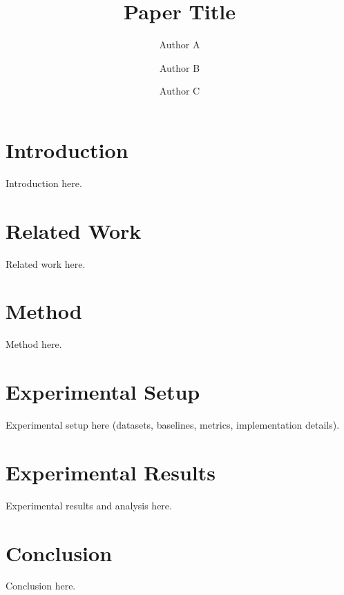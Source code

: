 \documentclass[10pt,a4paper,logo]{paper}
\title{Paper Title}
\author[1,\footnotesize{\textbf{*}}]{Author A}
\author[1,\footnotesize{\textbf{*}}]{Author B}
\author[1,\footnotesize{$\dagger$}]{Author C}
\affil[1]{KAIST AI}
\begin{document}
\maketitle
\suppressfloats[t] %

\section{Introduction}
\label{sec:introduction}
Introduction here.

\section{Related Work}
\label{sec:related_work}
Related work here.

\section{Method}
\label{sec:method}
Method here.

\section{Experimental Setup}
\label{sec:experimental_setup}
Experimental setup here (datasets, baselines, metrics, implementation details).

\section{Experimental Results}
\label{sec:experimental_result}
Experimental results and analysis here.

\section{Conclusion}
\label{sec:conclusion}
Conclusion here.




\end{document}
